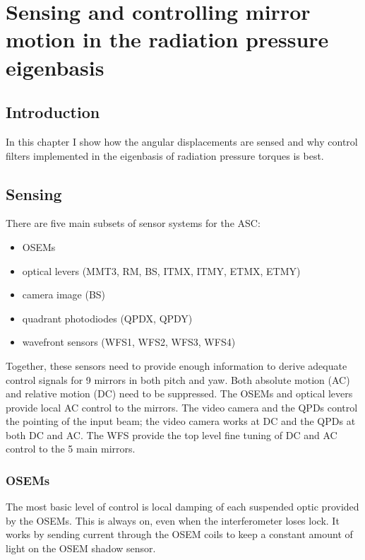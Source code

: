 \chapter{Sensing and controlling mirror motion in the radiation pressure eigenbasis} 


\section{Introduction}
In this chapter I show how the angular displacements are sensed and
why control filters implemented in the eigenbasis of radiation
pressure torques is best. 


\section{Sensing}
There are five main subsets of sensor systems for the ASC:
\begin{itemize}
\item OSEMs
\item optical levers (MMT3, RM, BS, ITMX, ITMY, ETMX, ETMY) \vspace{-10pt}
\item camera image (BS)
\item quadrant photodiodes (QPDX, QPDY) \vspace{-10pt}
\item wavefront sensors (WFS1, WFS2, WFS3, WFS4) \vspace{-10pt}
\end{itemize}
Together, these sensors need to provide enough information to derive
adequate control signals for 9 mirrors in both pitch and yaw. Both
absolute motion (AC) and relative motion (DC) need to be
suppressed. The OSEMs and optical levers provide local AC control to
the mirrors. The video camera and the QPDs control the pointing of the
input beam; the video camera works at DC and the QPDs at both DC and
AC. The WFS provide the top level fine tuning of DC and AC control to
the 5 main mirrors.


\subsection{OSEMs}
The most basic level of control is local damping of each suspended
optic provided by the OSEMs. This is always on, even when the
interferometer loses lock. It works by sending current through the
OSEM coils to keep a constant amount of light on the OSEM shadow
sensor.



